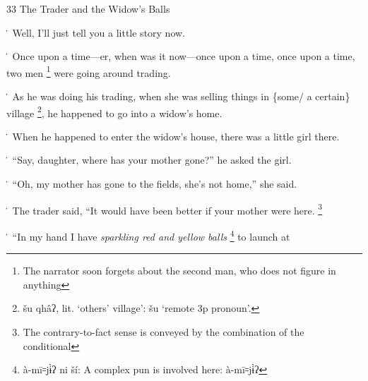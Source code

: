 
33 The Trader and the Widow's Balls

\. Well, I'll just tell you a little story now.

\. Once upon a time---er, when was it now---once upon a time, once upon a time,
two men \footnote{The narrator soon forgets about the second man, who does not figure in anything} were going around trading.

\. As he was doing his trading, when she was selling things in \{some/ a certain\}
village \footnote{šu qhâʔ, lit. `others' village': šu `remote 3p pronoun'.}, he happened to go into a widow's home.

\. When he happened to enter the widow's house, there was a little girl there.

\. ``Say, daughter, where has your mother gone?'' he asked the girl.

\. ``Oh, my mother has gone to the fields, she's not home,'' she said.

\. The trader said, ``It would have been better if your mother were here. \footnote{The contrary-to-fact sense is conveyed by the combination of the conditional}

\. ``In my hand I have \textit{sparkling red and yellow balls} \footnote{à-mī꞊jɨ̀ʔ ni ší: A complex pun is involved here: à-mī꞊jɨ̀ʔ} to launch at
